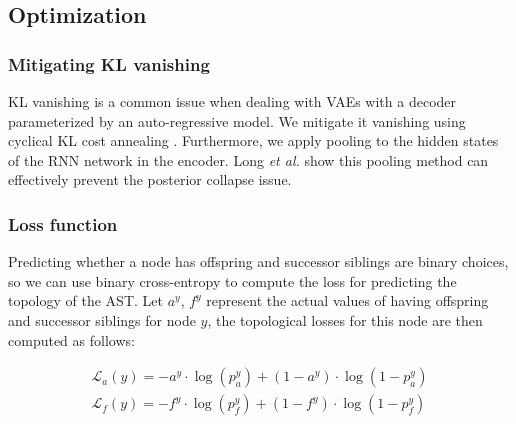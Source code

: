 % 


\subsection{Optimization}

\subsubsection{Mitigating KL vanishing}
KL vanishing is a common issue when dealing with VAEs with a decoder parameterized by an auto-regressive model.
We mitigate it vanishing using cyclical KL cost annealing \cite{fu2019cyclical}. Furthermore, we apply pooling to the hidden states of the RNN network in the encoder. Long \textit{et al.} \cite{long2019preventing} show this pooling method can effectively prevent the posterior collapse issue. 

\subsubsection{Loss function}
Predicting whether a node has offspring and successor siblings are binary choices, so we can use binary cross-entropy to compute the loss for predicting the topology of the AST. 
Let $a^y$, $f^y$ represent the actual values of having offspring and successor siblings for node $y$, the topological losses for this node are then computed as follows:

\begin{align}
    \mathcal{L}_{a}(y) = - a^y \cdot \log(p^y_a) + (1 - a^y) \cdot \log(1 - p^y_a) \\
    \mathcal{L}_{f}(y) = - f^y \cdot \log(p^y_f) + (1 - f^y) \cdot \log(1 - p^y_f)
\end{align}

